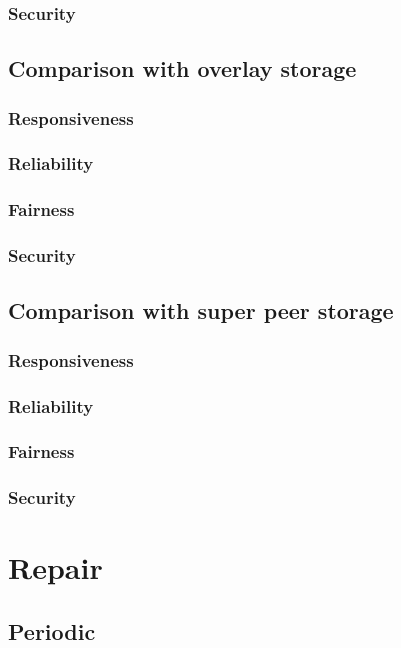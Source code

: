                 \subsubsection{Security}
            \subsection{Comparison with overlay storage}
                \subsubsection{Responsiveness}
                \subsubsection{Reliability}
                \subsubsection{Fairness}
                \subsubsection{Security}
            \subsection{Comparison with super peer storage}
                \subsubsection{Responsiveness}
                \subsubsection{Reliability}
                \subsubsection{Fairness}
                \subsubsection{Security}
                
    \section{Repair}
    \label{reliability_compare_retrieval}
            \subsection{Periodic}
